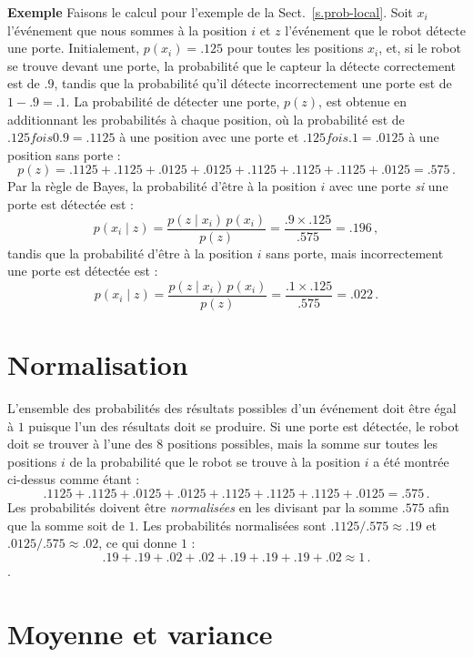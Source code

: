 \noindent\textbf{Exemple} Faisons le calcul pour l'exemple de la Sect.~\ref{s.prob-local}. Soit $x_i$ l'événement que nous sommes à la position $i$ et $z$ l'événement que le robot détecte une porte. Initialement, $p(x_i)=.125$ pour toutes les positions $x_i$, et, si le robot se trouve devant une porte, la probabilité que le capteur la détecte correctement est de $.9$, tandis que la probabilité qu'il détecte incorrectement une porte est de $1-.9=.1$. La probabilité de détecter une porte, $p(z)$, est obtenue en additionnant les probabilités à chaque position, où la probabilité est de $.125 fois 0.9 = .1125$ à une position avec une porte et $.125 fois .1= .0125$ à une position sans porte :
\[
p(z)= .1125 + .1125 + .0125 + .0125 + .1125 + .1125 + .1125 + .0125 = .575\,.
\]
Par la règle de Bayes, la probabilité d'être à la position $i$ avec une porte \emph{si} une porte est détectée est :
\[
p(x_i \mid z) = \frac{p(z\mid x_i)\, p(x_i)}{p(z)}=\frac{.9\times .125}{.575} = .196\,,
\]
tandis que la probabilité d'être à la position $i$ sans porte, mais incorrectement une porte est détectée est :
\[
p(x_i \mid z) = \frac{p(z\mid x_i)\, p(x_i)}{p(z)}=\frac{.1\times .125}{.575} = .022\,.
\]

\section{Normalisation}\label{a.normalize}

L'ensemble des probabilités des résultats possibles d'un événement doit être égal à $1$ puisque l'un des résultats doit se produire. Si une porte est détectée, le robot doit se trouver à l'une des $8$ positions possibles, mais la somme sur toutes les positions $i$ de la probabilité que le robot se trouve à la position $i$ a été montrée ci-dessus comme étant :
\[
.1125 + .1125 + .0125 + .0125 + .1125 + .1125 + .1125 + .0125 = .575\,.
\]
Les probabilités doivent être \emph{normalisées} en les divisant par la somme $.575$ afin que la somme soit de $1$. Les probabilités normalisées sont $.1125/.575\approx .19$ et $.0125/.575\approx .02$, ce qui donne $1$ :
\[.19 + .19 + .02 + .02 + .19 + .19 + .19 + .02 \approx 1\, .\].

\section{Moyenne et variance}\label{a.mean}

